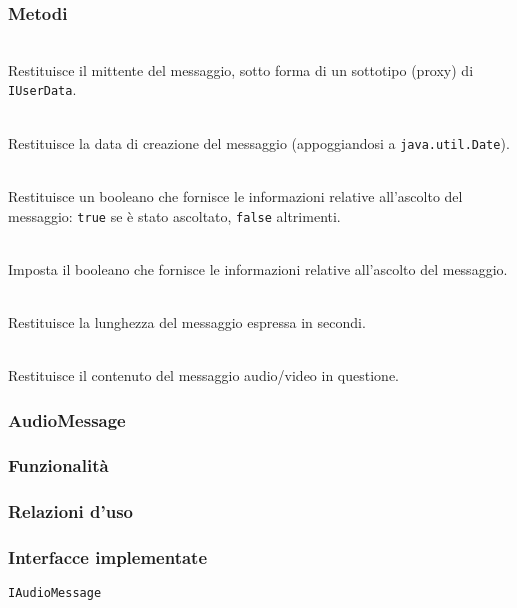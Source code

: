 \subsubsection*{Metodi}
\begin{description}
  \item{}\\
Restituisce il mittente del messaggio, sotto forma di un sottotipo (proxy) di \texttt{IUserData}.
  \item{}\\
Restituisce la data di creazione del messaggio (appoggiandosi a \texttt{java.util.Date}).
  \item{}\\
Restituisce un booleano che fornisce le informazioni relative all'ascolto del messaggio: \texttt{true} se è stato ascoltato, \texttt{false} altrimenti.
  \item{}\\
Imposta il booleano che fornisce le informazioni relative all'ascolto del messaggio.
  \item{}\\
Restituisce la lunghezza del messaggio espressa in secondi.
  \item{}\\
Restituisce il contenuto del messaggio audio/video in questione.
\end{description}

\subsubsection{AudioMessage}\label{sec:audiomessage}

\subsubsection*{Funzionalità}

\subsubsection*{Relazioni d'uso}

\subsubsection*{Interfacce implementate}
\texttt{IAudioMessage}

